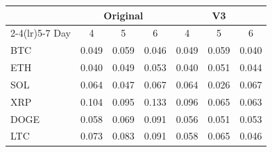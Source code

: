 \begin{tabular}{lcccccc}
\toprule
& \multicolumn{3}{c}{Original} & \multicolumn{3}{c}{V3} \\
\cmidrule(lr){2-4}\cmidrule(lr){5-7}
Day & 4 & 5 & 6 & 4 & 5 & 6 \\
\midrule
BTC & 0.049 & 0.059 & 0.046 & 0.049 & 0.059 & 0.040 \\
ETH & 0.040 & 0.049 & 0.053 & 0.040 & 0.051 & 0.044 \\
SOL & 0.064 & 0.047 & 0.067 & 0.064 & 0.026 & 0.067 \\
XRP & 0.104 & 0.095 & 0.133 & 0.096 & 0.065 & 0.063 \\
DOGE & 0.058 & 0.069 & 0.091 & 0.056 & 0.051 & 0.053 \\
LTC & 0.073 & 0.083 & 0.091 & 0.058 & 0.065 & 0.046 \\
\bottomrule
\end{tabular}

